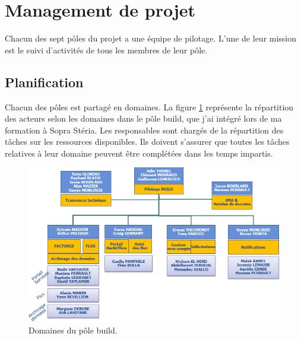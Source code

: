 \documentclass[12pt,a4paper]{article}
\begin{document}
\section{Management de projet}
Chacun des sept pôles du projet a une équipe de pilotage. L'une de leur mission est le suivi d'activités de tous les membres de leur pôle. 
\subsection{Planification}
Chacun des pôles est partagé en domaines. La figure \ref{domaines} représente la répartition des acteurs selon les domaines dans le pôle build, que j'ai intégré lors de ma formation à Sopra Stéria. Les responsables sont chargés de la répartition des tâches sur les ressources disponibles. Ils doivent s'assurer que toutes les tâches relatives à leur domaine peuvent être complétées dans les temps impartis.
\begin{figure}[H]
	\begin{center}
		\includegraphics[width=\textwidth,keepaspectratio]{domaines.png}
		\caption{Domaines du pôle build.}
		\label{domaines}
	\end{center}
\end{figure}
\end{document}
